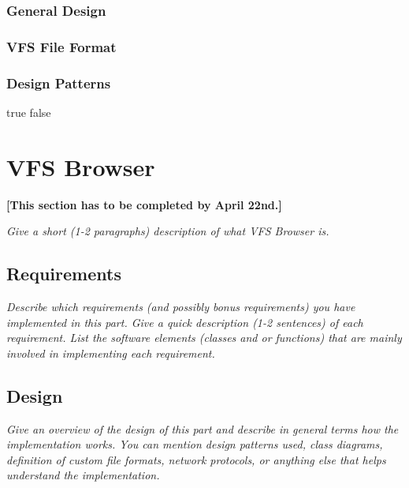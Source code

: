 \documentclass[a4paper,12pt]{article}
\begin{document}
\subsubsection{General Design}

\subsubsection{VFS File Format}

\subsubsection{Design Patterns}

\ifx true false



\section{VFS Browser}

\textbf{[This section has to be completed by April 22nd.]}

\emph{Give a short (1-2 paragraphs) description of what VFS Browser is.}


\subsection{Requirements}

\emph{Describe which requirements (and possibly bonus requirements) you have implemented in this part. Give a quick description (1-2 sentences) of each requirement. List the software elements (classes and or functions) that are mainly involved in implementing each requirement.}


\subsection{Design}

\emph{Give an overview of the design of this part and describe in general terms how the implementation works. You can mention design patterns used, class diagrams, definition of custom file formats, network protocols, or anything else that helps understand the implementation.}
\end{document}
